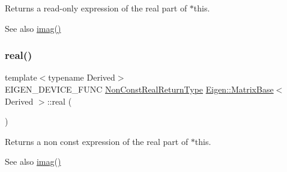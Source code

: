 \begin{DoxyReturn}{Returns}
a read-\/only expression of the real part of {\ttfamily $\ast$this}.
\end{DoxyReturn}
\begin{DoxySeeAlso}{See also}
\mbox{\hyperlink{class_eigen_1_1_matrix_base_aa60c37d8bb4139f7254d4fb9e2cebb68}{imag()}} 
\end{DoxySeeAlso}
\mbox{\label{class_eigen_1_1_matrix_base_a1738254da7bde8e46bb50b47a60adff0}} 
\subsubsection{\texorpdfstring{real()}{real()}\hspace{0.1cm}{\footnotesize\ttfamily [2/2]}}
{\footnotesize\ttfamily template$<$typename Derived$>$ \\
E\+I\+G\+E\+N\+\_\+\+D\+E\+V\+I\+C\+E\+\_\+\+F\+U\+NC \mbox{\hyperlink{struct_eigen_1_1internal_1_1true__type}{Non\+Const\+Real\+Return\+Type}} \mbox{\hyperlink{class_eigen_1_1_matrix_base}{Eigen\+::\+Matrix\+Base}}$<$ Derived $>$\+::real (\begin{DoxyParamCaption}{ }\end{DoxyParamCaption})\hspace{0.3cm}{\ttfamily [inline]}}

\begin{DoxyReturn}{Returns}
a non const expression of the real part of {\ttfamily $\ast$this}.
\end{DoxyReturn}
\begin{DoxySeeAlso}{See also}
\mbox{\hyperlink{class_eigen_1_1_matrix_base_aa60c37d8bb4139f7254d4fb9e2cebb68}{imag()}} 
\end{DoxySeeAlso}
\mbox{\label{class_eigen_1_1_matrix_base_a67eb836f331d9b567e7f36ec0782fa07}} 
